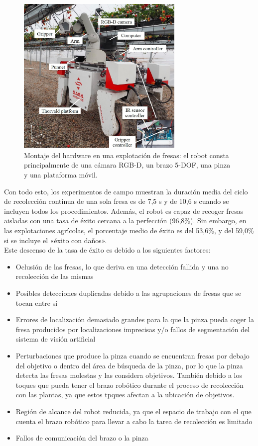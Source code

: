 \begin{figure} [h!]
    \begin{center}
      \includegraphics[width=8cm]{figs/Hardware assembly in a strawberry farm.jpg}
    \end{center}
    \caption{Montaje del hardware en una explotación de fresas: el robot consta principalmente de una cámara RGB-D, un brazo 5-DOF, una pinza y una plataforma móvil.}
    \label{fig:Robot_Xiong}
\end{figure}

Con todo esto, los experimentos de campo muestran la duración media del ciclo de recolección continua de una sola fresa es de 7,5 s y de 10,6 s cuando se incluyen todos los procedimientos. Además, el robot es capaz de recoger fresas aisladas con una tasa de éxito cercana a la perfección (96,8\%). Sin embargo, en las explotaciones agrícolas, el porcentaje medio de éxito es del 53,6\%, y del 59,0\% si se incluye el «éxito con daños». \\

Este descenso de la tasa de éxito es debido a los siguientes factores:

\begin{itemize}
    \item Oclusión de las fresas, lo que deriva en una detección fallida y una no recolección de las mismas
    \item Posibles detecciones duplicadas debido a las agrupaciones de fresas que se tocan entre sí
    \item Errores de localización demasiado grandes para la que la pinza pueda coger la fresa producidos por localizaciones imprecisas y/o fallos de segmentación del sistema de visión artificial
    \item Perturbaciones que produce la pinza cuando se encuentran fresas por debajo del objetivo o dentro del área de búsqueda de la pinza, por lo que la pinza detecta las fresas molestas y las considera objetivos. También debido a los toques que pueda tener el brazo robótico durante el proceso de recolección con las plantas, ya que estos tpques afectan a la ubicación de objetivos.
    \item Región de alcance del robot reducida, ya que el espacio de trabajo con el que cuenta el brazo robótico para llevar a cabo la tarea de recolección es limitado
    \item Fallos de comunicación del brazo o la pinza
\end{itemize}

